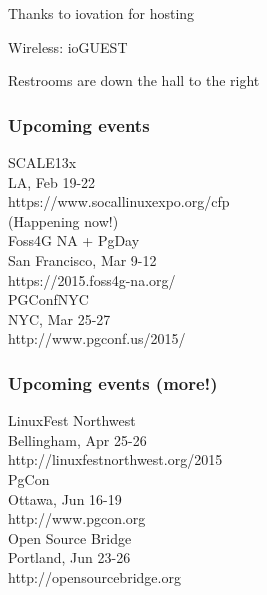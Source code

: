 \documentclass{beamer}
\begin{document}

\frame
{
  \begin{center}
  \item[]Thanks to iovation for hosting
  \item[]Wireless: ioGUEST
  \item[]Restrooms are down the hall to the right
  \end{center}
}

\frame
{
  \frametitle{Upcoming events}
  \begin{center}
{\large SCALE13x\\}
LA, Feb 19-22\\
https://www.socallinuxexpo.org/cfp\\
(Happening now!)\\
\vspace{5 mm}
{\large Foss4G NA + PgDay\\}
San Francisco, Mar 9-12\\
https://2015.foss4g-na.org/\\
\vspace{5 mm}
{\large PGConfNYC\\}
NYC, Mar 25-27\\
http://www.pgconf.us/2015/\\
  \end{center}
}

\frame
{
  \frametitle{Upcoming events (more!)}
  \begin{center}
{\large LinuxFest Northwest\\}
Bellingham, Apr 25-26\\
http://linuxfestnorthwest.org/2015\\
\vspace{5 mm}
{\large PgCon\\}
Ottawa, Jun 16-19\\
http://www.pgcon.org\\
\vspace{5 mm}
{\large Open Source Bridge\\}
Portland, Jun 23-26\\
http://opensourcebridge.org\\
  \end{center}
}
\end{document}

